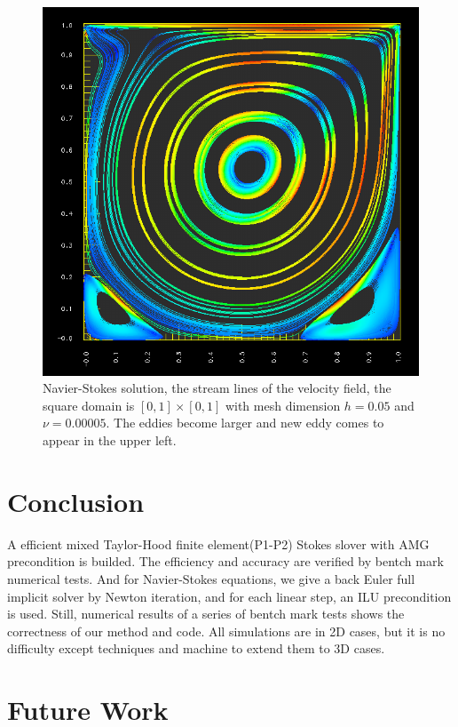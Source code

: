 \documentclass[a4paper]{article}
\begin{document}
\begin{figure}[h]
\centering
\includegraphics[scale = 0.5]{images/e.png}
\caption{Navier-Stokes solution, the stream lines of the velocity
  field, the square domain is $[0, 1] \times [0, 1]$ with mesh
  dimension $h=0.05$ and $\nu=0.00005$. The eddies become larger and
  new eddy comes to appear in the upper left.}
\label{im::d}
\end{figure}

\section{Conclusion}
A efficient mixed Taylor-Hood finite element(P1-P2) Stokes slover with
AMG precondition is builded. The efficiency and accuracy are verified
by bentch mark numerical tests. And for Navier-Stokes equations, we
give a back Euler full implicit solver by Newton iteration, and for
each linear step, an ILU precondition is used. Still, numerical
results of a series of bentch mark tests shows the correctness of our
method and code. All simulations are in 2D cases, but it is no
difficulty except techniques and machine to extend them to 3D cases.

\section{Future Work}
\end{document}
